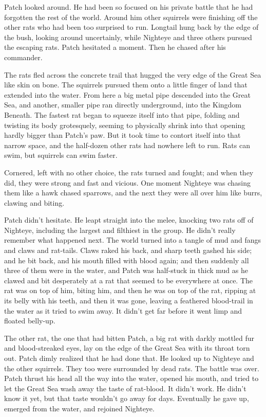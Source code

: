\documentclass[11pt]{article}
\begin{document}
 Patch looked around. He had been so focused on his private battle that he had forgotten the rest of the world. Around him other squirrels were finishing off the other rats who had been too surprised to run. Longtail hung back by the edge of the bush, looking around uncertainly, while Nighteye and three others pursued the escaping rats. Patch hesitated a moment. Then he chased after his commander.\par
 The rats fled across the concrete trail that hugged the very edge of the Great Sea like skin on bone. The squirrels pursued them onto a little finger of land that extended into the water. From here a big metal pipe descended into the Great Sea, and another, smaller pipe ran directly underground, into the Kingdom Beneath. The fastest rat began to squeeze itself into that pipe, folding and twisting its body grotesquely, seeming to physically shrink into that opening hardly bigger than Patch's paw. But it took time to contort itself into that narrow space, and the half-dozen other rats had nowhere left to run. Rats can swim, but squirrels can swim faster.\par
 Cornered, left with no other choice, the rats turned and fought; and when they did, they were strong and fast and vicious. One moment Nighteye was chasing them like a hawk chased sparrows, and the next they were all over him like burrs, clawing and biting.\par
 Patch didn't hesitate. He leapt straight into the melee, knocking two rats off of Nighteye, including the largest and filthiest in the group. He didn't really remember what happened next. The world turned into a tangle of mud and fangs and claws and rat-tails. Claws raked his back, and sharp teeth gashed his side; and he bit back, and his mouth filled with blood again; and then suddenly all three of them were in the water, and Patch was half-stuck in thick mud as he clawed and bit desperately at a rat that seemed to be everywhere at once. The rat was on top of him, biting him, and then he was on top of the rat, ripping at its belly with his teeth, and then it was gone, leaving a feathered blood-trail in the water as it tried to swim away. It didn't get far before it went limp and floated belly-up.\par
 The other rat, the one that had bitten Patch, a big rat with darkly mottled fur and blood-streaked eyes, lay on the edge of the Great Sea with its throat torn out. Patch dimly realized that he had done that. He looked up to Nighteye and the other squirrels. They too were surrounded by dead rats. The battle was over. Patch thrust his head all the way into the water, opened his mouth, and tried to let the Great Sea wash away the taste of rat-blood. It didn't work. He didn't know it yet, but that taste wouldn't go away for days. Eventually he gave up, emerged from the water, and rejoined Nighteye.\par
\end{document}
